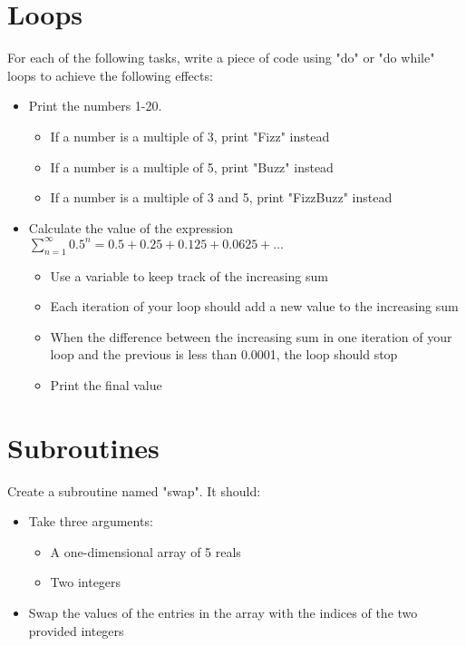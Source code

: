 \documentclass[11pt,a4paper]{article}
\begin{document}
\section{Loops}
For each of the following tasks, write a piece of code using "do" or "do while" loops to achieve the following effects:
\begin{itemize}
    \item Print the numbers 1-20.
    \begin{itemize}
        \item If a number is a multiple of 3, print "Fizz" instead
        \item If a number is a multiple of 5, print "Buzz" instead
        \item If a number is a multiple of 3 and 5, print "FizzBuzz" instead
    \end{itemize}
    \item Calculate the value of the expression $\sum\limits_{n=1}^{\infty}0.5^{n} = 0.5+0.25+0.125+0.0625+\hdots$
    \begin{itemize}
        \item Use a variable to keep track of the increasing sum
        \item Each iteration of your loop should add a new value to the increasing sum
        \item When the difference between the increasing sum in one iteration of your loop and the previous is less than 0.0001, the loop should stop
        \item Print the final value
    \end{itemize}
\end{itemize}

\section{Subroutines}

Create a subroutine named "swap". It should:

\begin{itemize}
    \item Take three arguments:
    \begin{itemize}
        \item A one-dimensional array of 5 reals
        \item Two integers
    \end{itemize}
    \item Swap the values of the entries in the array with the indices of the two provided integers
\end{itemize}
\end{document}
